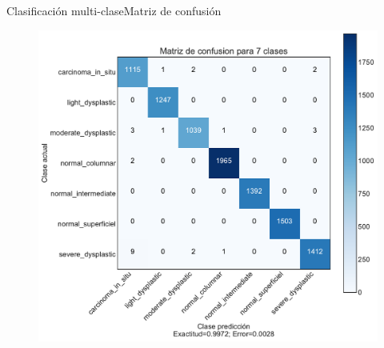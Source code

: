 \documentclass{beamer}
\begin{document}
        


    \begin{frame}{Clasificación multi-clase}{Matriz de confusión}
        \begin{figure}[]
            \centering
            \includegraphics[height=0.95\textheight]{reporte_7_class/matriz.pdf}
        \end{figure}
    \end{frame}

\end{document}
